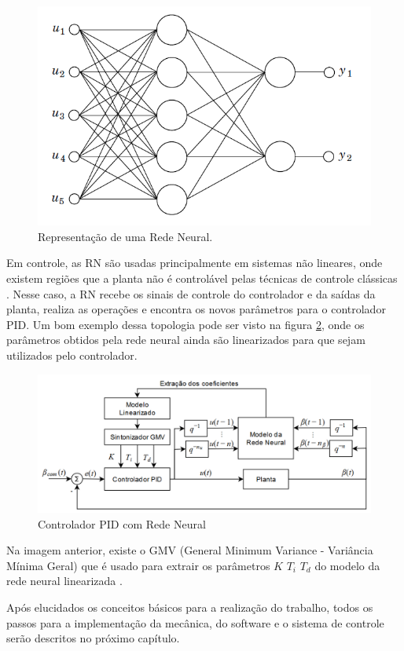 \begin{figure}[H]
  \caption{Representação de uma Rede Neural.}
  \begin{center}
      \includegraphics[scale=0.5]{referencial/img/feedforward_neural_astrom_p297}
  \end{center}
  \label{fig:feedforward_neural_astrom_p297}
\end{figure}

Em controle, as RN são usadas principalmente em sistemas não lineares, onde existem regiões que a planta não é controlável pelas técnicas de controle clássicas . Nesse caso, a RN recebe os sinais de controle do controlador e da saídas da planta, realiza as operações e encontra os novos parâmetros para o controlador PID. Um bom exemplo dessa topologia pode ser visto na figura \ref{fig:pid_neural_chen_p212}, onde os parâmetros obtidos pela rede neural ainda são linearizados para que sejam utilizados pelo controlador.

\begin{figure}[H]
  \caption{Controlador PID com Rede Neural}
  \begin{center}
      \includegraphics[scale=0.55]{referencial/img/pid_neural_chen_p212}
  \end{center}
  \label{fig:pid_neural_chen_p212}
\end{figure}

Na imagem anterior, existe o GMV (General Minimum Variance - Variância Mínima Geral) que é usado para extrair os parâmetros $K$ $T_i$ $T_d$ do modelo da rede neural linearizada .

Após elucidados os conceitos básicos para a realização do trabalho, todos os passos para a implementação da mecânica, do software e o sistema de controle serão descritos no próximo capítulo.


